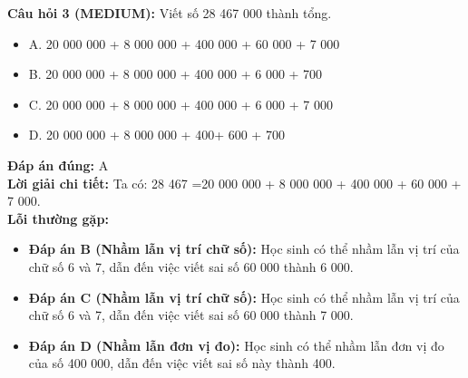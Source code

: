 \documentclass{article}
\begin{document}
\begin{minipage}{\textwidth}
\noindent\textbf{Câu hỏi 3 (MEDIUM):} Viết số 28 467 000 thành tổng. 
\begin{itemize}[label={}]
    \item A. 20 000 000 + 8 000 000 + 400 000 + 60 000 + 7 000
    \item B. 20 000 000 + 8 000 000 + 400 000 + 6 000 + 700
    \item C. 20 000 000 + 8 000 000 + 400 000 + 6 000 + 7 000
    \item D. 20 000 000 + 8 000 000 + 400+ 600 + 700
\end{itemize}
\textbf{Đáp án đúng:} A \\
\textbf{Lời giải chi tiết:} Ta có: 28 467 =20 000 000 + 8 000 000 + 400 000 + 60 000 + 7 000. \\
\textbf{Lỗi thường gặp:}
\begin{itemize}
  \item \textbf{Đáp án B (Nhầm lẫn vị trí chữ số):} Học sinh có thể nhầm lẫn vị trí của chữ số 6 và 7, dẫn đến việc viết sai số 60 000 thành 6 000.
  \item \textbf{Đáp án C (Nhầm lẫn vị trí chữ số):} Học sinh có thể nhầm lẫn vị trí của chữ số 6 và 7, dẫn đến việc viết sai số 60 000 thành 7 000.
  \item \textbf{Đáp án D (Nhầm lẫn đơn vị đo):} Học sinh có thể nhầm lẫn đơn vị đo của số 400 000, dẫn đến việc viết sai số này thành 400.
\end{itemize}
\end{minipage}
\vspace{1em}
\end{document}
